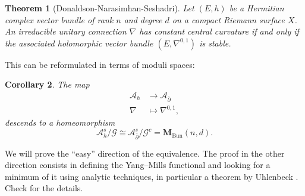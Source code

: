 \documentclass[12pt,a4paper]{book}
\newtheorem{thm}{Theorem}[section]
\newtheorem{corol}[thm]{Corollary}
\theoremstyle{definition} \newtheorem{defn}[thm]{Definition}
\theoremstyle{definition} \newtheorem{ejemplo}[thm]{Example}
\theoremstyle{remark} \newtheorem{rem}[thm]{Remark}
\def\AA{\mathscr{A}}
\def\GG{\mathscr{G}}
\def\Bun{\mathbf{M}_{\mathrm{Bun}}}
\def\delbar{\bar{\partial}}
\begin{document}
\begin{thm}[Donaldson-Narasimhan-Seshadri]\label{narasimhanseshadri}
  Let $(E,h)$ be a Hermitian complex vector bundle of rank $n$ and degree $d$ on a compact Riemann surface $X$. An irreducible unitary connection $\nabla$ has constant central curvature if and only if the associated holomorphic vector bundle $(E,\nabla^{0,1})$ is stable.
\end{thm}
This can be reformulated in terms of moduli spaces:
\begin{corol}
  The map
  \begin{align*}
    \AA_h&\longrightarrow \AA_{\delbar}\\ 
     \nabla &\longmapsto \nabla^{0,1}, 
    \end{align*}
    descends to a homeomorphism
    \begin{equation*}
      \AA_h^s/\GG \cong \AA^s_{\delbar} /\GG^c = \Bun(n,d).
    \end{equation*}
\end{corol}
We will prove the ``easy'' direction of the equivalence. The proof in the other direction consists in defining the Yang--Mills functional and looking for a minimum of it using analytic techniques, in particular a theorem by Uhlenbeck \cite{uhlenbeck}. Check \cite{donaldson} for the details.
\end{document}
